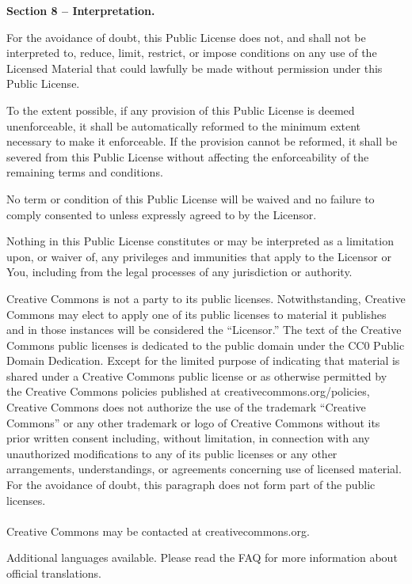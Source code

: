 \par \textbf{Section 8 – Interpretation.}
\begin{doclicense@enumerate}
\item For the avoidance of doubt, this Public License does not, and shall not be interpreted to, reduce, limit, restrict, or impose conditions on any use of the Licensed Material that could lawfully be made without permission under this Public License.
\item To the extent possible, if any provision of this Public License is deemed unenforceable, it shall be automatically reformed to the minimum extent necessary to make it enforceable. If the provision cannot be reformed, it shall be severed from this Public License without affecting the enforceability of the remaining terms and conditions.
\item No term or condition of this Public License will be waived and no failure to comply consented to unless expressly agreed to by the Licensor.
\item Nothing in this Public License constitutes or may be interpreted as a limitation upon, or waiver of, any privileges and immunities that apply to the Licensor or You, including from the legal processes of any jurisdiction or authority.
\end{doclicense@enumerate}

\par Creative Commons is not a party to its public licenses. Notwithstanding, Creative Commons may elect to apply one of its public licenses to material it publishes and in those instances will be considered the “Licensor.” The text of the Creative Commons public licenses is dedicated to the public domain under the CC0 Public Domain Dedication. Except for the limited purpose of indicating that material is shared under a Creative Commons public license or as otherwise permitted by the Creative Commons policies published at creativecommons.org/policies, Creative Commons does not authorize the use of the trademark “Creative Commons” or any other trademark or logo of Creative Commons without its prior written consent including, without limitation, in connection with any unauthorized modifications to any of its public licenses or any other arrangements, understandings, or agreements concerning use of licensed material. For the avoidance of doubt, this paragraph does not form part of the public licenses.\\\\
Creative Commons may be contacted at creativecommons.org.
\par Additional languages available. Please read the FAQ for more information about official translations.



